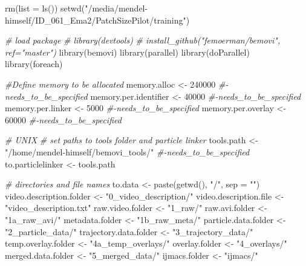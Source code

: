 \documentclass[
]{article}
\newenvironment{Shaded}{\begin{snugshade}}{\end{snugshade}}
\newcommand{\AttributeTok}[1]{\textcolor[rgb]{0.77,0.63,0.00}{#1}}
\newcommand{\CommentTok}[1]{\textcolor[rgb]{0.56,0.35,0.01}{\textit{#1}}}
\newcommand{\DecValTok}[1]{\textcolor[rgb]{0.00,0.00,0.81}{#1}}
\newcommand{\FunctionTok}[1]{\textcolor[rgb]{0.00,0.00,0.00}{#1}}
\newcommand{\NormalTok}[1]{#1}
\newcommand{\OtherTok}[1]{\textcolor[rgb]{0.56,0.35,0.01}{#1}}
\newcommand{\StringTok}[1]{\textcolor[rgb]{0.31,0.60,0.02}{#1}}
\begin{document}
\begin{Shaded}
\begin{Highlighting}[]
\FunctionTok{rm}\NormalTok{(}\AttributeTok{list =} \FunctionTok{ls}\NormalTok{())}
\FunctionTok{setwd}\NormalTok{(}\StringTok{"/media/mendel{-}himself/ID\_061\_Ema2/PatchSizePilot/training"}\NormalTok{)}

\CommentTok{\# load package}
\CommentTok{\# library(devtools)}
\CommentTok{\# install\_github("femoerman/bemovi", ref="master")}
\FunctionTok{library}\NormalTok{(bemovi)}
\FunctionTok{library}\NormalTok{(parallel)}
\FunctionTok{library}\NormalTok{(doParallel)}
\FunctionTok{library}\NormalTok{(foreach)}

\CommentTok{\#Define memory to be allocated}
\NormalTok{memory.alloc }\OtherTok{\textless{}{-}} \DecValTok{240000} \CommentTok{\#{-}needs\_to\_be\_specified}
\NormalTok{memory.per.identifier }\OtherTok{\textless{}{-}} \DecValTok{40000} \CommentTok{\#{-}needs\_to\_be\_specified}
\NormalTok{memory.per.linker }\OtherTok{\textless{}{-}} \DecValTok{5000} \CommentTok{\#{-}needs\_to\_be\_specified}
\NormalTok{memory.per.overlay }\OtherTok{\textless{}{-}} \DecValTok{60000} \CommentTok{\#{-}needs\_to\_be\_specified}

\CommentTok{\# UNIX}
\CommentTok{\# set paths to tools folder and particle linker}
\NormalTok{tools.path }\OtherTok{\textless{}{-}}
  \StringTok{"/home/mendel{-}himself/bemovi\_tools/"} \CommentTok{\#{-}needs\_to\_be\_specified}
\NormalTok{to.particlelinker }\OtherTok{\textless{}{-}}\NormalTok{ tools.path}

\CommentTok{\# directories and file names}
\NormalTok{to.data }\OtherTok{\textless{}{-}} \FunctionTok{paste}\NormalTok{(}\FunctionTok{getwd}\NormalTok{(), }\StringTok{"/"}\NormalTok{, }\AttributeTok{sep =} \StringTok{""}\NormalTok{)}
\NormalTok{video.description.folder }\OtherTok{\textless{}{-}} \StringTok{"0\_video\_description/"}
\NormalTok{video.description.file }\OtherTok{\textless{}{-}} \StringTok{"video\_description.txt"}
\NormalTok{raw.video.folder }\OtherTok{\textless{}{-}} \StringTok{"1\_raw/"}
\NormalTok{raw.avi.folder }\OtherTok{\textless{}{-}} \StringTok{"1a\_raw\_avi/"}
\NormalTok{metadata.folder }\OtherTok{\textless{}{-}} \StringTok{"1b\_raw\_meta/"}
\NormalTok{particle.data.folder }\OtherTok{\textless{}{-}} \StringTok{"2\_particle\_data/"}
\NormalTok{trajectory.data.folder }\OtherTok{\textless{}{-}} \StringTok{"3\_trajectory\_data/"}
\NormalTok{temp.overlay.folder }\OtherTok{\textless{}{-}} \StringTok{"4a\_temp\_overlays/"}
\NormalTok{overlay.folder }\OtherTok{\textless{}{-}} \StringTok{"4\_overlays/"}
\NormalTok{merged.data.folder }\OtherTok{\textless{}{-}} \StringTok{"5\_merged\_data/"}
\NormalTok{ijmacs.folder }\OtherTok{\textless{}{-}} \StringTok{"ijmacs/"}



\end{Highlighting}
\end{Shaded}
\end{document}
